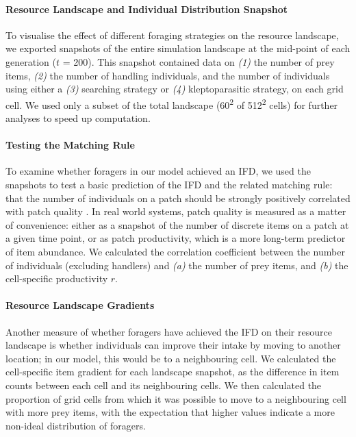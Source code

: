 \documentclass[11pt]{article}
\begin{document}
\paragraph{Resource Landscape and Individual Distribution Snapshot}

To visualise the effect of different foraging strategies on the resource landscape, we exported snapshots of the entire simulation landscape at the mid-point of each generation ($t$ = 200).
This snapshot contained data on \textit{(1)} the number of prey items, \textit{(2)} the number of handling individuals, and the number of individuals using either a \textit{(3)} searching strategy or \textit{(4)} kleptoparasitic strategy, on each grid cell.
We used only a subset of the total landscape (60\textsuperscript{2} of 512\textsuperscript{2} cells) for further analyses to speed up computation.

\paragraph{Testing the Matching Rule}

To examine whether foragers in our model achieved an IFD, we used the snapshots to test a basic prediction of the IFD and the related matching rule: that the number of individuals on a patch should be strongly positively correlated with patch quality \citep{fretwell1970,parker1978}.
In real world systems, patch quality is measured as a matter of convenience: either as a snapshot of the number of discrete items on a patch at a given time point, or as patch productivity, which is a more long-term predictor of item abundance.
We calculated the correlation coefficient between the number of individuals (excluding handlers) and \textit{(a)} the number of prey items, and \textit{(b)} the cell-specific productivity $r$.

\paragraph{Resource Landscape Gradients}

Another measure of whether foragers have achieved the IFD on their resource landscape is whether individuals can improve their intake by moving to another location; in our model, this would be to a neighbouring cell.
We calculated the cell-specific item gradient for each landscape snapshot, as the difference in item counts between each cell and its neighbouring cells.
We then calculated the proportion of grid cells from which it was possible to move to a neighbouring cell with more prey items, with the expectation that higher values indicate a more non-ideal distribution of foragers.
\end{document}
